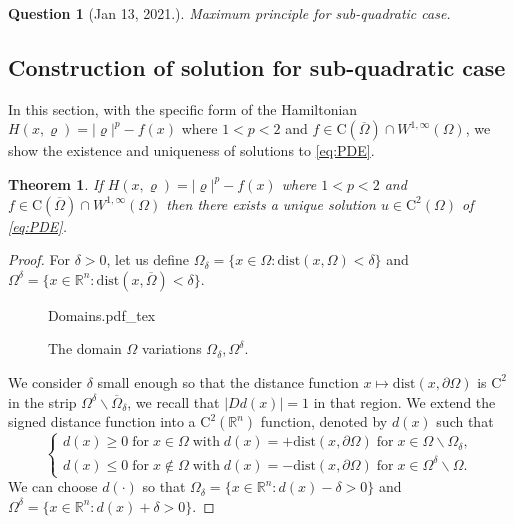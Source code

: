 \documentclass[11pt,reqno]{amsart}
\numberwithin{figure}{section}
\theoremstyle{plain}
\newtheorem{thm}{Theorem}[section]
\newtheorem{quest}{Question}
\theoremstyle{remark}
\numberwithin{equation}{section}
\newcommand{\incfig}[1]{%
    \def\svgwidth{\columnwidth}
    {#1.pdf_tex}
}
\begin{document}
\begin{quest} [Jan 13, 2021.] Maximum principle for sub-quadratic case.
\end{quest}


\begin{appendices}
\section{Construction of solution for sub-quadratic case}
In this section, with the specific form of the Hamiltonian $H(x,\varrho) = |\varrho|^p - f(x)$ where $1<p< 2$ and $f\in \mathrm{C}(\overline{\Omega})\cap W^{1,\infty}(\Omega)$, we show the existence and uniqueness of solutions to \eqref{eq:PDE}. 
\begin{thm} If $H(x,\varrho) = |\varrho|^p - f(x)$ where $1<p< 2$ and $f\in \mathrm{C}(\overline{\Omega})\cap W^{1,\infty}(\Omega)$ then there exists a unique solution $u\in \mathrm{C}^2(\Omega)$ of \eqref{eq:PDE}.
\end{thm}


\begin{proof} For $\delta>0$, let us define $\Omega_\delta = \{x\in \Omega: \mathrm{dist}(x,\Omega) < \delta\}$ and $\Omega^\delta = \{x\in \mathbb{R}^n: \mathrm{dist}(x,\overline{\Omega}) < \delta\}$. 
\begin{figure}[ht]
    \centering
    \def\svgwidth{0.5\columnwidth}
    {Domains.pdf_tex}
    \caption{The domain $\Omega$ variations $\Omega_\delta, \Omega^\delta$.}
    \label{fig:Domains}
\end{figure}
We consider $\delta$ small enough so that the distance function $x\mapsto \mathrm{dist}(x,\partial \Omega)$ is $\mathrm{C}^2$ in the strip $\Omega^\delta\backslash \overline{\Omega}_\delta$, we recall that $|D d(x)| = 1$ in that region. We extend the signed distance function into a $\mathrm{C}^2(\mathbb{R}^n)$ function, denoted by $d(x)$ such that 
\begin{equation*}
    \begin{cases}
    d(x)\geq 0\;\text{for}\;x\in\Omega\;\text{with}\;d(x) = +\mathrm{dist}(x,\partial\Omega)\;\text{for}\;x\in \Omega\backslash \Omega_\delta,\\
    d(x)\leq 0\;\text{for}\;x\notin \Omega\;\text{with}\;d(x) = -\mathrm{dist}(x,\partial\Omega)\;\text{for}\;x\in \Omega^\delta\backslash \Omega.
    \end{cases}
\end{equation*}
We can choose $d(\cdot)$ so that $\Omega_\delta = \{x\in \mathbb{R}^n: d(x)-\delta >0 \}$ and $\Omega^\delta = \{x\in \mathbb{R}^n: d(x) +\delta>0\}$.


\end{proof}
\end{appendices}
\end{document}
